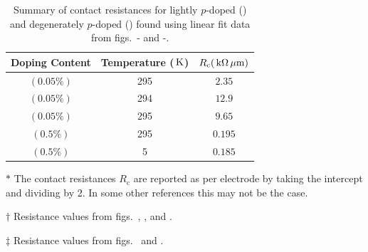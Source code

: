 \begin{table}[ht]
	\centering
	\begin{threeparttable}
		\begin{tabular}{c c c}
			\toprule
			Doping Content & Temperature ($\,\mathrm{K}$) & $R_\mathrm{c}(\,\mathrm{k\Omega}\,\mathrm{\mu m})$\tnote{$\ast$} \\ [0.5ex]
			\midrule
			$(0.05\%)$ \lightlyfive & 295 & $2.35$\tnote{$\dagger$}\\
			$(0.05\%)$ \lightlyfive & 294 & $12.9$\tnote{$\dagger$}\\
			$(0.05\%)$ \lightlyfive & 295 & $9.65$\tnote{$\dagger$}\\ 
			$(0.5\%)$ \degenerate & 295 & $0.195$\tnote{$\ddagger$}\\ 
			$(0.5\%)$ \degenerate & 5 & $0.185$\tnote{$\ddagger$}\\[1ex]
			\bottomrule
		\end{tabular}
		\begin{tablenotes}
			\item[$\ast$] The contact resistances $R_\mathrm{c}$ are reported as per electrode by taking the intercept and dividing by 2. In some other references this may not be the case.
			\item[$\dagger$] Resistance values from figs.~, , and .
			\item[$\ddagger$] Resistance values from figs.~ and .
		\end{tablenotes}
	\caption[Summary of contact resistances lightly $p$-doped and degenerately $p$-doped ]{Summary of contact resistances for lightly $p$-doped  (\lightlyfive) and degenerately $p$-doped  (\degenerate) found using linear fit data from figs.~- and -.}
	\label{table:contact_summary}
	\end{threeparttable}
\end{table}

